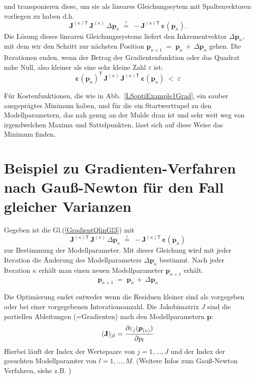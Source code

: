 und transponieren diese, um sie als lineares Gleichungssytem mit Spaltenvektoren vorliegen zu haben
d.h.
\begin{equation}
 \boldsymbol{J}^{(\kappa) \textsf{T}} \, \boldsymbol{J}^{(\kappa)} \, \Delta \mathbf{p}_\kappa
\; \overset{!}{=} \; 
-  \boldsymbol{J}^{(\kappa) \textsf{T}} \, \boldsymbol{\varepsilon}(\mathbf{p}_\kappa) .
\label{GradientQlinGl3}
\end{equation}
Die Lösung dieses linearen Gleichungssystems liefert den Inkrementvektor $\Delta \mathbf{p}_\kappa$,
mit dem wir den Schritt zur nächsten Position $\mathbf{p}_{\kappa+1} \; = \; \mathbf{p}_{\kappa} \, + \,
\Delta \mathbf{p}_{\kappa}$ gehen. Die Iterationen enden, wenn der Betrag der Gradientenfunktion oder
das Quadrat nahe Null, also kleiner als eine sehr kleine Zahl $\varepsilon$ ist:
\begin{equation}
 \boldsymbol{\varepsilon}(\mathbf{p}_\kappa)^\mathsf{T}
\, \boldsymbol{J}^{(\kappa)} \, \boldsymbol{J}^{(\kappa) \textsf{T}} \, \boldsymbol{\varepsilon}(\mathbf{p}_\kappa) \;
< \; \varepsilon
\end{equation}

Für Kostenfunktionen, die wie in Abb.~\ref{LSoptiExample1Grad}, ein sauber ausgeprägtes Minimum
haben, und für die ein Startwerttupel zu den Modellparametern, das nah genug an der Mulde dran ist und
sehr weit weg von irgendwelchen Maxima und Sattelpunkten, lässt sich auf diese Weise das Minimum
finden.

\section{Beispiel zu Gradienten-Verfahren nach Gauß-Newton für den Fall gleicher Varianzen}

Gegeben ist die Gl.(\ref{GradientQlinGl3}) mit  
\[
 \boldsymbol{J}^{(\kappa) \textsf{T}} \, \boldsymbol{J}^{(\kappa)} \, \Delta \mathbf{p}_\kappa
\; \overset{!}{=} \; 
-  \boldsymbol{J}^{(\kappa) \textsf{T}} \, \boldsymbol{\varepsilon}(\mathbf{p}_\kappa)
\]
zur Bestimmung der Modellparameter. Mit dieser Gleichung wird mit jeder Iteration die Änderung des Modellparameters
$\Delta \mathbf{p}_\kappa$ bestimmt. Nach jeder Iteration $\kappa$  erhält man einen neuen Modellparameter  $\mathbf{p}_{\kappa +1}$ erhält. 
\[
\mathbf{p}_{\kappa+1} \; = \; \mathbf{p}_{\kappa} \, + \,
\Delta \mathbf{p}_{\kappa}
\]

Die Optimierung endet entweder wenn die Residuen kleiner sind als vorgegeben oder
bei einer vorgegebenen Interationsanzahl. 
Die Jakobimatrix $J$ sind die partiellen Ableitungen (=Gradienten) nach den 
Modellparametern $\boldsymbol{p}$: 
\[ (\mathbf{J})_{jl} = \frac{\displaystyle \partial \varepsilon_j (\boldsymbol p_{(\kappa)})}{\displaystyle \partial  p_l}\]
Hierbei läuft der Index der Wertepaare von $j=1,\ldots,J$  und der Index
der gesuchten Modellparamter von $l=1,\ldots,M$. 
(Weitere Infos zum Gauß-Newton Verfahren, siehe z.B. \cite{Wiki02})

